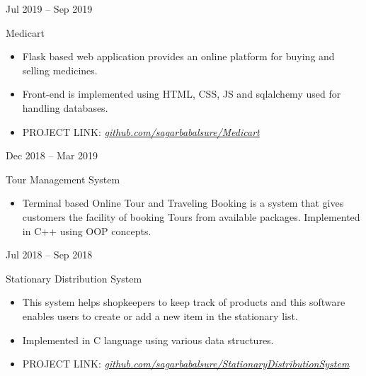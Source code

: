 \documentclass[a4paper,10pt]{article}
\newlength{\cvcolumngapwidth}
\newlength{\cvleftcolumnwidth}
\newlength{\cvrightcolumnwidth}
\newcommand{\cvtitlestyle}[1]{{\large\cvtitlefont\textcolor{cvtitlecolor}{#1}}}
\newcommand{\cvdurationstyle}[1]{{\small\cvdurationfont\textcolor{cvdurationcolor}{#1}}}
\newlength{\cvafteritemskipamount}
\newlength{\cvaftertitleskipamount}
\newlength{\cvparskip}
\newcommand{\cvitem}[2]{
    \begin{minipage}[t]{\cvleftcolumnwidth}
        \raggedleft #1
    \end{minipage}%
    \hspace{\cvcolumngapwidth}%
    \begin{minipage}[t]{\cvrightcolumnwidth}
        \setlength{\parskip}{\cvparskip} #2
    \end{minipage}

    \vspace{\cvafteritemskipamount}
}
\newcommand{\cvtitle}[1]{
    \cvtitlestyle{#1}

    \vspace{\cvaftertitleskipamount}
    \vspace{-\cvparskip}
}
\begin{document}


\cvitem{
    \cvdurationstyle{Jul 2019 -- Sep 2019}
}{
    \cvtitle{Medicart}


    \begin{itemize}[leftmargin=*]
         \item Flask based web application provides an online platform for buying and selling medicines.
        \item Front-end is implemented using HTML, CSS, JS and sqlalchemy used for handling databases.
         \item PROJECT LINK: \textit{\href{https://github.com/sagarbabalsure/Medicart}{github.com/sagarbabalsure/Medicart}}
    \end{itemize}
}

\cvitem{
    \cvdurationstyle{Dec 2018 -- Mar 2019}
}{
    \cvtitle{Tour Management System}


    \begin{itemize}[leftmargin=*]
         \item Terminal based Online Tour and Traveling Booking is a system that gives customers the facility of booking Tours from available packages. Implemented in C++ using OOP concepts. 
    \end{itemize}
}

\cvitem{
    \cvdurationstyle{Jul 2018 -- Sep 2018}
}{
    \cvtitle{Stationary Distribution System}


    \begin{itemize}[leftmargin=*]
         \item This system helps shopkeepers to keep track of products and this software enables users to create or add a new item in the stationary list.
         \item Implemented in C language using various data structures.
         \item PROJECT LINK: 
         \textit{\href{https://github.com/sagarbabalsure/StationaryDistributionSystem}{github.com/sagarbabalsure/StationaryDistributionSystem}}
    \end{itemize}
}
\end{document}
